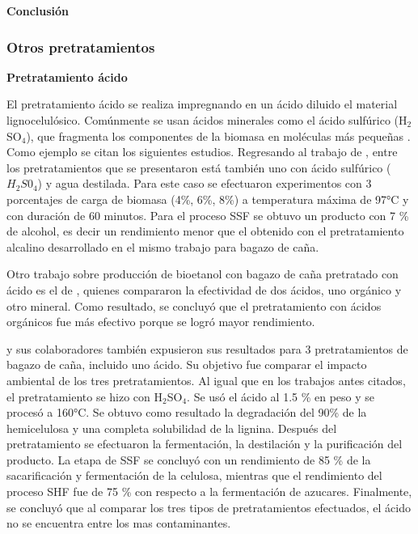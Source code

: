 \documentclass[12pt]{article}
\begin{document}
\textbf{Conclusión}\\








\subsubsection{Otros pretratamientos} 



\textbf{Pretratamiento ácido} 

El pretratamiento ácido se realiza impregnando en un ácido diluido el material lignocelulósico. Comúnmente se usan ácidos minerales como el ácido sulfúrico (H$_2$SO$_4$), que fragmenta los componentes de la biomasa en moléculas más pequeñas \cite{Galbe2012}. Como ejemplo se citan los siguientes estudios. %
Regresando al trabajo de \cite{Arturo2022evaluacion}, entre los pretratamientos que se presentaron está también uno con ácido sulfúrico ($H_2 S0_4$) y agua destilada. Para este caso se efectuaron experimentos con 3 porcentajes de carga de biomasa (4\%, 6\%, 8\%) a temperatura máxima de 97°C y con duración de 60 minutos. Para el proceso SSF se obtuvo un producto con 7 \% de alcohol, es decir un rendimiento menor que el obtenido con el pretratamiento alcalino desarrollado en el mismo trabajo para bagazo de caña.

Otro trabajo sobre producción de bioetanol con bagazo de caña  pretratado con ácido es el de \cite{TANTAYOTAI2022102499}, quienes compararon la efectividad de dos ácidos, uno orgánico y otro mineral. Como resultado, se concluyó que el pretratamiento con ácidos orgánicos fue más efectivo porque se logró mayor rendimiento.

\cite{rojas2010analisis} y sus colaboradores también expusieron sus resultados para 3 pretratamientos de bagazo de caña, incluido uno ácido. Su objetivo fue comparar el impacto ambiental de los tres pretratamientos. Al igual que en los trabajos antes citados, el pretratamiento se hizo con H$_2$SO$_4$. Se usó el ácido al 1.5 \% en peso y se procesó a 160°C. Se obtuvo como resultado la degradación del 90\% de la hemicelulosa y una completa solubilidad de la lignina. Después del pretratamiento se efectuaron la fermentación, la destilación y la purificación del producto. La etapa de SSF se concluyó con un rendimiento de 85 \% de la sacarificación y fermentación de la celulosa, mientras que el rendimiento del proceso SHF fue de 75 \%  con respecto a la fermentación de azucares. Finalmente, se concluyó que al comparar los tres tipos de pretratamientos efectuados, el ácido no se encuentra entre los mas contaminantes.
\end{document}
